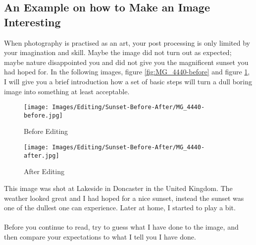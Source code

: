 \subsection{An Example on how to Make an Image Interesting}

When photography is practised as an art, your post processing is only limited by your imagination and skill. Maybe the image did not turn out as expected; maybe nature disappointed you and did not give you the magnificent sunset you had hoped for. In the following images, figure \ref{fig:MG_4440-before} and figure \ref{fig:MG_4440}, I will give you a brief introduction how a set of basic steps will turn a dull boring image into something at least acceptable.

\begin{figure}[htb]
\begin{minipage}{.5\textwidth}
	\centering
		\texttt{[image: Images/Editing/Sunset-Before-After/MG\_4440-before.jpg]}
	\caption{Before Editing}
	\label{fig:MG_4440-before}
\end{minipage}
\begin{minipage}{.5\textwidth}
	\centering
		\texttt{[image: Images/Editing/Sunset-Before-After/MG\_4440-after.jpg]}
	\caption{After Editing}
	\label{fig:MG_4440}
\end{minipage}	
\end{figure}

This image was shot at Lakeside in Doncaster in the United Kingdom. The weather looked great and I had hoped for a nice sunset, instead the sunset was one of the dullest one can experience. Later at home, I started to play a bit.
\\
\\
Before you continue to read, try to guess what I have done to the image, and then compare your expectations to what I tell you I have done.

